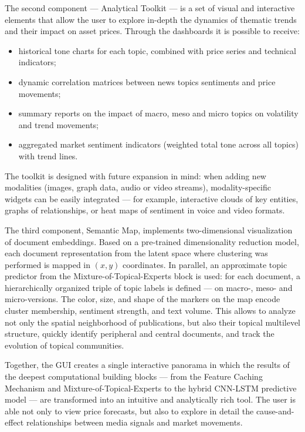 The second component --- Analytical Toolkit --- is a set of visual and interactive elements that allow
the user to explore in-depth the dynamics of thematic trends and their impact on asset prices. Through
the dashboards it is possible to receive:

\begin{itemize}
    \item historical tone charts for each topic, combined with price series and technical indicators;
    \item dynamic correlation matrices between news topics sentiments and price movements;
    \item summary reports on the impact of macro, meso and micro topics on volatility and trend movements;
    \item aggregated market sentiment indicators (weighted total tone across all topics) with trend lines.
\end{itemize}

The toolkit is designed with future expansion in mind: when adding new modalities (images, graph data, audio
or video streams), modality-specific widgets can be easily integrated — for example, interactive clouds of key
entities, graphs of relationships, or heat maps of sentiment in voice and video formats.

The third component, Semantic Map, implements two-dimensional visualization of document embeddings. Based
on a pre-trained dimensionality reduction model, each document representation from the latent space where
clustering was performed is mapped in $(x,y)$ coordinates. In parallel, an approximate topic predictor
from the Mixture-of-Topical-Experts block is used: for each document, a hierarchically organized triple
of topic labels is defined — on macro-, meso- and micro-versions. The color, size, and shape of the markers
on the map encode cluster membership, sentiment strength, and text volume. This allows to analyze not only
the spatial neighborhood of publications, but also their topical multilevel structure, quickly identify
peripheral and central documents, and track the evolution of topical communities.

Together, the GUI creates a single interactive panorama in which the results of the deepest computational
building blocks — from the Feature Caching Mechanism and Mixture-of-Topical-Experts to the hybrid CNN-LSTM
predictive model — are transformed into an intuitive and analytically rich tool. The user is able not only
to view price forecasts, but also to explore in detail the cause-and-effect relationships between media
signals and market movements.


